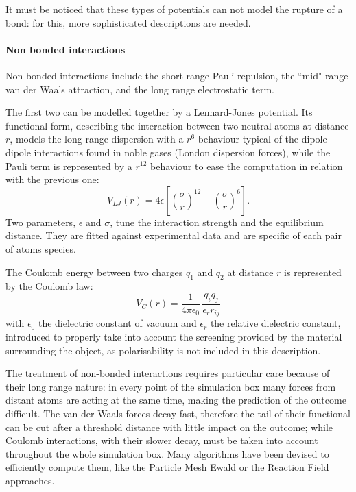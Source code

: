 It must be noticed that these types of potentials can not model the rupture of a bond: for this, more sophisticated descriptions are needed.


\paragraph{Non bonded interactions}
Non bonded interactions include the short range Pauli repulsion, the ``mid"-range van der Waals attraction, and the long range electrostatic term.

The first two can be modelled together by a Lennard-Jones potential. Its functional form, describing the interaction between two neutral atoms at distance $r$, models the long range dispersion with a $r^6$ behaviour typical of the dipole-dipole interactions found in noble gases (London dispersion forces), while the Pauli term is represented by a $r^{12}$ behaviour to ease the computation in relation with the previous one:
\begin{equation}
V_{LJ}(r) = 4 \epsilon \left[ \left( \frac{\sigma}{r} \right)^{12} - \left( \frac{\sigma}{r} \right)^6 \right].
\end{equation}
Two parameters, $\epsilon$ and $\sigma$, tune the interaction strength and the equilibrium distance. They are fitted against experimental data and are specific of each pair of atoms species.

The Coulomb energy between two charges $q_1$ and $q_2$ at distance $r$ is represented by the Coulomb law:
\begin{equation}
V_C(r) = \frac{1}{4 \pi \epsilon_0} \, \frac{q_i q_j}{\epsilon_r r_{ij}}
\end{equation}
with $\epsilon_0$ the dielectric constant of vacuum and $\epsilon_r$ the relative dielectric constant, introduced to properly take into account the screening provided by the material surrounding the object, as polarisability is not included in this description.

The treatment of non-bonded interactions requires particular care because of their long range nature: in every point of the simulation box many forces from distant atoms are acting at the same time, making the prediction of the outcome difficult.
%
The van der Waals forces decay fast, therefore the tail of their functional can be cut after a threshold distance with little impact on the outcome; while Coulomb interactions, with their slower decay, must be taken into account throughout the whole simulation box. Many algorithms have been devised to efficiently compute them, like the Particle Mesh Ewald \cite{Essmann1995} or the Reaction Field \cite{Tironi1995} approaches. 

